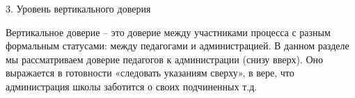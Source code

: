 \begin{frame}{3. Уровень вертикального доверия}

\tiny

Вертикальное доверие – это доверие между участниками процесса с разным формальным статусами: между педагогами и администрацией. В данном разделе мы рассматриваем доверие педагогов к администрации (снизу вверх). Оно выражается в готовности «следовать указаниям сверху», в вере, что администрация школы заботится о своих подчиненных т.д. 
\end{frame}


